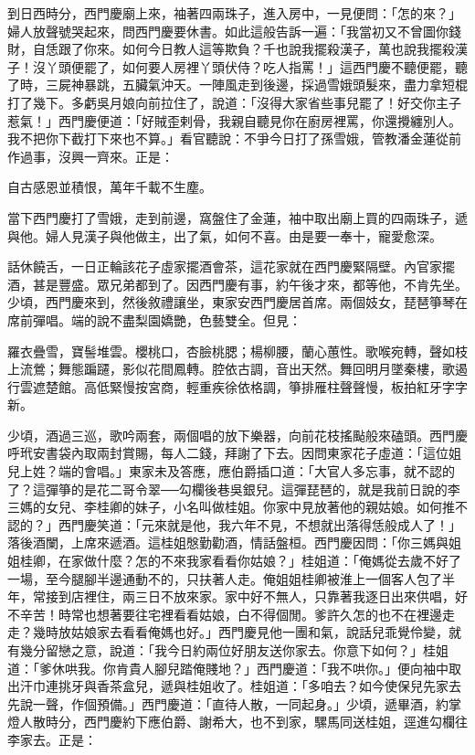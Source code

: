 到日西時分，西門慶廟上來，袖著四兩珠子，進入房中，一見便問：「怎的來？」婦人放聲號哭起來，問西門慶要休書。如此這般告訴一遍：「我當初又不曾圖你錢財，自恁跟了你來。如何今日教人這等欺負？千也說我擺殺漢子，萬也說我擺殺漢子！沒丫頭便罷了，如何要人房裡丫頭伏侍？吃人指罵！」這西門慶不聽便罷，聽了時，三屍神暴跳，五臟氣沖天。一陣風走到後邊，採過雪娥頭髮來，盡力拿短棍打了幾下。多虧吳月娘向前拉住了，說道：「沒得大家省些事兒罷了！好交你主子惹氣！」西門慶便道：「好賊歪剌骨，我親自聽見你在廚房裡罵，你還攪纏別人。我不把你下截打下來也不算。」看官聽說：不爭今日打了孫雪娥，管教潘金蓮從前作過事，沒興一齊來。正是：

自古感恩並積恨，萬年千載不生塵。

當下西門慶打了雪娥，走到前邊，窩盤住了金蓮，袖中取出廟上買的四兩珠子，遞與他。婦人見漢子與他做主，出了氣，如何不喜。由是要一奉十，寵愛愈深。

話休饒舌，一日正輪該花子虛家擺酒會茶，這花家就在西門慶緊隔壁。內官家擺酒，甚是豐盛。眾兄弟都到了。因西門慶有事，約午後才來，都等他，不肯先坐。少頃，西門慶來到，然後敘禮讓坐，東家安西門慶居首席。兩個妓女，琵琶箏琴在席前彈唱。端的說不盡梨園嬌艷，色藝雙全。但見：

羅衣疊雪，寶髻堆雲。櫻桃口，杏臉桃腮；楊柳腰，蘭心蕙性。歌喉宛轉，聲如枝上流鶯；舞態蹁躚，影似花間鳳轉。腔依古調，音出天然。舞回明月墜秦樓，歌遏行雲遮楚館。高低緊慢按宮商，輕重疾徐依格調，箏排雁柱聲聲慢，板拍紅牙字字新。

少頃，酒過三巡，歌吟兩套，兩個唱的放下樂器，向前花枝搖颭般來磕頭。西門慶呼玳安書袋內取兩封賞賜，每人二錢，拜謝了下去。因問東家花子虛道：「這位姐兒上姓？端的會唱。」東家未及答應，應伯爵插口道：「大官人多忘事，就不認的了？這彈箏的是花二哥令翠──勾欄後巷吳銀兒。這彈琵琶的，就是我前日說的李三媽的女兒、李桂卿的妹子，小名叫做桂姐。你家中見放著他的親姑娘。如何推不認的？」西門慶笑道：「元來就是他，我六年不見，不想就出落得恁般成人了！」 落後酒闌，上席來遞酒。這桂姐慇勤勸酒，情話盤桓。西門慶因問：「你三媽與姐姐桂卿，在家做什麼？怎的不來我家看看你姑娘？」桂姐道：「俺媽從去歲不好了一場，至今腿腳半邊通動不的，只扶著人走。俺姐姐桂卿被淮上一個客人包了半年，常接到店裡住，兩三日不放來家。家中好不無人，只靠著我逐日出來供唱，好不辛苦！時常也想著要往宅裡看看姑娘，白不得個閒。爹許久怎的也不在裡邊走走？幾時放姑娘家去看看俺媽也好。」西門慶見他一團和氣，說話兒乖覺伶變，就有幾分留戀之意，說道：「我今日約兩位好朋友送你家去。你意下如何？」桂姐道：「爹休哄我。你肯貴人腳兒踏俺賤地？」西門慶道：「我不哄你。」便向袖中取出汗巾連挑牙與香茶盒兒，遞與桂姐收了。桂姐道：「多咱去？如今使保兒先家去先說一聲，作個預備。」西門慶道：「直待人散，一同起身。」少頃，遞畢酒，約掌燈人散時分，西門慶約下應伯爵、謝希大，也不到家，騾馬同送桂姐，逕進勾欄往李家去。正是：

